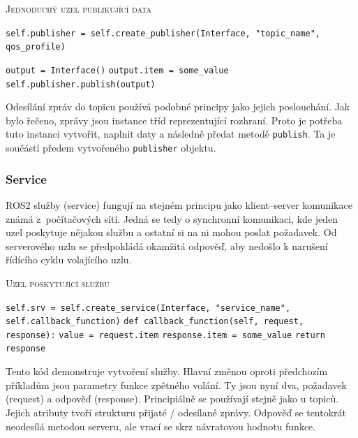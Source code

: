 \begin{algorithm}[h!]
	\label{}
	\caption{\textsc{Jednoduchý uzel publikující data}}
	
	\DontPrintSemicolon
	\SetAlgoNoLine
	\SetNlSty{}{}{:}
	\SetNlSkip{-1.1em}
	
	\BlankLine \Indp\Indpp
	\texttt{self.publisher = self.create\_publisher(Interface, "topic\_name", qos\_profile)}\;
	
	\BlankLine
	\texttt{output = Interface()}\;
	\texttt{output.item = some\_value}\;
	\texttt{self.publisher.publish(output)}\;
\end{algorithm}
Odesílání zpráv do topicu používá podobné principy jako jejich poslouchání. Jak bylo řečeno, zprávy jsou instance tříd reprezentující rozhraní. Proto je potřeba tuto instanci vytvořit, naplnit daty a následně předat metodě \verb|publish|. Ta je součástí předem vytvořeného \verb|publisher| objektu. \cite{ros2_documentation}

\subsubsection*{Service}
ROS2 služby (service) fungují na stejném principu jako klient--server komunikace známá z~počítačových sítí. Jedná se tedy o synchronní komunikaci, kde jeden uzel poskytuje nějakou službu a ostatní si na ni mohou poslat požadavek. Od serverového uzlu se předpokládá okamžitá odpověď, aby nedošlo k narušení řídícího cyklu volajícího uzlu. \cite[str:~6]{ros2_introduction}

\begin{algorithm}[h!]
	\label{}
	\caption{\textsc{Uzel poskytující službu}}
	
	\DontPrintSemicolon
	\SetAlgoNoLine
	\SetAlgoNlRelativeSize{-1}
	\SetNlSty{}{}{:}
	\SetNlSkip{-1.1em}
	
	\BlankLine \Indp\Indpp
	
	\texttt{self.srv = self.create\_service(Interface, "service\_name", self.callback\_function)}\;
	\BlankLine
	\texttt{def callback\_function(self, request, response):}\;
	\Indp\Indp
	\texttt{value = request.item}\;
	\texttt{response.item = some\_value}\;
	\texttt{return response}\;
	
\end{algorithm}
Tento kód demonstruje vytvoření služby. Hlavní změnou oproti předchozím příkladům jsou parametry funkce zpětného volání. Ty jsou nyní dva, požadavek (request) a odpověď (response). Principiálně se používají stejně jako u topiců. Jejich atributy tvoří strukturu přijaté / odesílané zprávy. Odpověď se tentokrát neodesílá metodou serveru, ale vrací se skrz návratovou hodnotu funkce. \cite{ros2_documentation}


